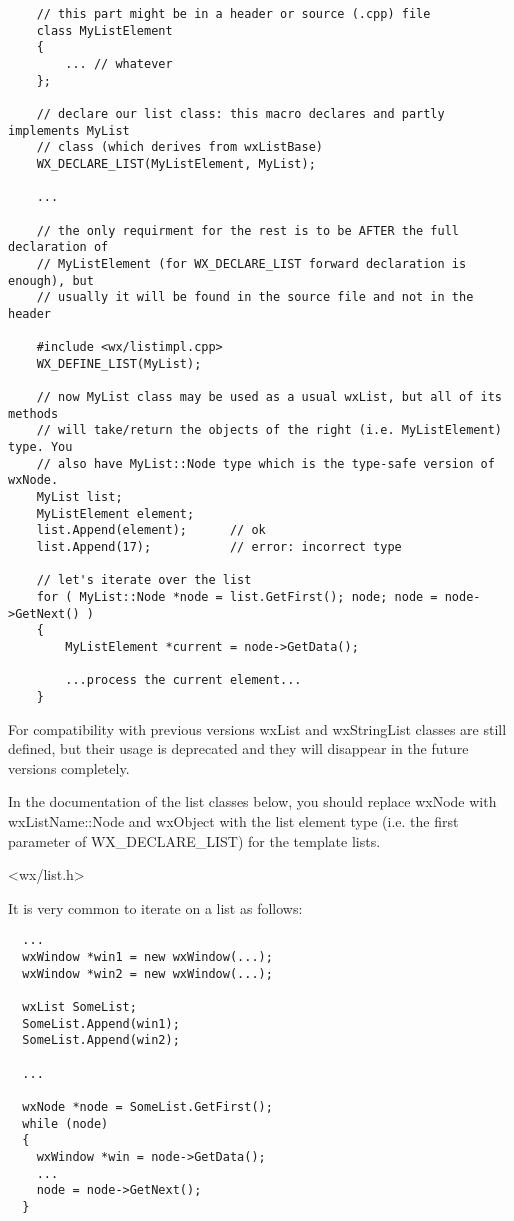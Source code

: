 {\small%
\begin{verbatim}
    // this part might be in a header or source (.cpp) file
    class MyListElement
    {
        ... // whatever
    };

    // declare our list class: this macro declares and partly implements MyList
    // class (which derives from wxListBase)
    WX_DECLARE_LIST(MyListElement, MyList);

    ...

    // the only requirment for the rest is to be AFTER the full declaration of
    // MyListElement (for WX_DECLARE_LIST forward declaration is enough), but
    // usually it will be found in the source file and not in the header

    #include <wx/listimpl.cpp>
    WX_DEFINE_LIST(MyList);

    // now MyList class may be used as a usual wxList, but all of its methods
    // will take/return the objects of the right (i.e. MyListElement) type. You
    // also have MyList::Node type which is the type-safe version of wxNode.
    MyList list;
    MyListElement element;
    list.Append(element);      // ok
    list.Append(17);           // error: incorrect type

    // let's iterate over the list
    for ( MyList::Node *node = list.GetFirst(); node; node = node->GetNext() )
    {
        MyListElement *current = node->GetData();

        ...process the current element...
    }
\end{verbatim}
}

For compatibility with previous versions wxList and wxStringList classes are
still defined, but their usage is deprecated and they will disappear in the
future versions completely.

In the documentation of the list classes below, you should replace wxNode with
wxListName::Node and wxObject with the list element type (i.e. the first
parameter of WX\_DECLARE\_LIST) for the template lists.




<wx/list.h>


It is very common to iterate on a list as follows:

\begin{verbatim}
  ...
  wxWindow *win1 = new wxWindow(...);
  wxWindow *win2 = new wxWindow(...);

  wxList SomeList;
  SomeList.Append(win1);
  SomeList.Append(win2);

  ...

  wxNode *node = SomeList.GetFirst();
  while (node)
  {
    wxWindow *win = node->GetData();
    ...
    node = node->GetNext();
  }
\end{verbatim}

